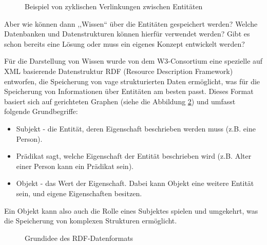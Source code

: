\begin{figure}[ht]
\vbox{\small}
\caption{Beispiel von zyklischen Verlinkungen zwischen Entitäten}
\label{fig:cyclent}
\end{figure}
Aber wie können dann ,,Wissen`` über die Entitäten gespeichert werden? Welche Datenbanken und Datenstrukturen können hierfür verwendet werden? Gibt es schon bereits eine Lösung oder muss ein eigenes Konzept entwickelt werden?

Für die Darstellung von Wissen wurde von dem W3-Consortium\cite{klyne2006resource} eine spezielle auf XML basierende Datenstruktur RDF (Resource Description Framework) entworfen, die Speicherung von vage strukturierten Daten ermöglicht, was für die Speicherung von Informationen über Entitäten am besten passt. Dieses Format basiert sich auf gerichteten Graphen (siehe die Abbildung \ref{fig:graph-rdf}) und umfasst folgende Grundbegriffe:
\begin{itemize}
\item Subjekt - die Entität, deren Eigenschaft beschrieben werden muss (z.B. eine Person).
\item Prädikat sagt, welche Eigenschaft der Entität beschrieben wird (z.B. Alter einer Person kann ein Prädikat sein).
\item Objekt - das Wert der Eigenschaft. Dabei kann Objekt eine weitere Entität sein, und eigene Eigenschaften besitzen. 
\end{itemize}
Ein Objekt kann also auch die Rolle eines Subjektes spielen und umgekehrt, was die Speicherung von komplexen Strukturen ermöglicht.

\begin{figure}[ht]
\vbox{\small}
\caption{Grundidee des RDF-Datenformats}
\label{fig:graph-rdf}
\end{figure}

